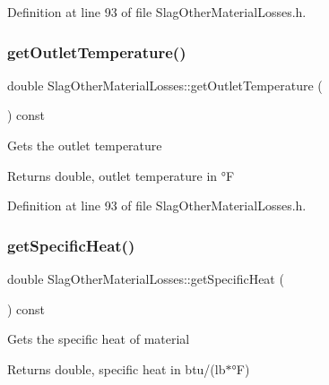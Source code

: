Definition at line 93 of file Slag\+Other\+Material\+Losses.\+h.

\mbox{\label{class_slag_other_material_losses_a1c48f1a70aaf030451b7e350f3d6cd18}} 
\subsubsection{\texorpdfstring{get\+Outlet\+Temperature()}{getOutletTemperature()}\hspace{0.1cm}{\footnotesize\ttfamily [3/3]}}
{\footnotesize\ttfamily double Slag\+Other\+Material\+Losses\+::get\+Outlet\+Temperature (\begin{DoxyParamCaption}{ }\end{DoxyParamCaption}) const\hspace{0.3cm}{\ttfamily [inline]}}

Gets the outlet temperature \begin{DoxyReturn}{Returns}
double, outlet temperature in °F 
\end{DoxyReturn}


Definition at line 93 of file Slag\+Other\+Material\+Losses.\+h.

\mbox{\label{class_slag_other_material_losses_aa68e92bdf836a4112c55344f897f2649}} 
\subsubsection{\texorpdfstring{get\+Specific\+Heat()}{getSpecificHeat()}\hspace{0.1cm}{\footnotesize\ttfamily [1/3]}}
{\footnotesize\ttfamily double Slag\+Other\+Material\+Losses\+::get\+Specific\+Heat (\begin{DoxyParamCaption}{ }\end{DoxyParamCaption}) const\hspace{0.3cm}{\ttfamily [inline]}}

Gets the specific heat of material \begin{DoxyReturn}{Returns}
double, specific heat in btu/(lb$\ast$°F) 
\end{DoxyReturn}


